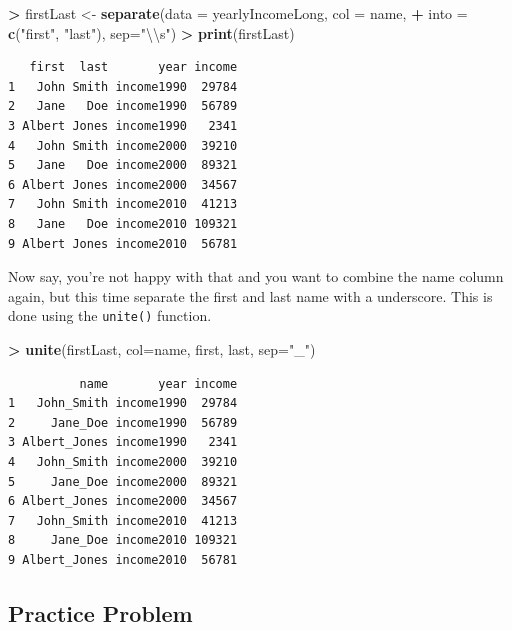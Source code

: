 \documentclass[
]{krantz}
\makeatletter
\newenvironment{Shaded}{\begin{snugshade}}{\end{snugshade}}
\newcommand{\CharTok}[1]{\textcolor[rgb]{0.5,0.5,0.5}{#1}}
\newcommand{\DataTypeTok}[1]{\textcolor[rgb]{0.27,0.27,0.27}{#1}}
\newcommand{\KeywordTok}[1]{\textcolor[rgb]{0.27,0.27,0.27}{\textbf{#1}}}
\newcommand{\NormalTok}[1]{#1}
\newcommand{\OperatorTok}[1]{\textcolor[rgb]{0.43,0.43,0.43}{\textbf{#1}}}
\newcommand{\StringTok}[1]{\textcolor[rgb]{0.5,0.5,0.5}{#1}}
\newenvironment{kframe}{%
\medskip{}
\setlength{\fboxsep}{.8em}
 \def\at@end@of@kframe{}%
 \ifinner\ifhmode%
  \def\at@end@of@kframe{\end{minipage}}%
  \begin{minipage}{\columnwidth}%
 \fi\fi%
 \def\FrameCommand##1{\hskip\@totalleftmargin \hskip-\fboxsep
 \colorbox{shadecolor}{##1}\hskip-\fboxsep
     \hskip-\linewidth \hskip-\@totalleftmargin \hskip\columnwidth}%
 \MakeFramed {\advance\hsize-\width
   \@totalleftmargin\z@ \linewidth\hsize
   \@setminipage}}%
 {\par\unskip\endMakeFramed%
 \at@end@of@kframe}
\renewenvironment{Shaded}{\begin{kframe}}{\end{kframe}}
\makeatother
\begin{document}
\begin{Shaded}
\begin{Highlighting}[]
\OperatorTok{\textgreater{}}\StringTok{ }\NormalTok{firstLast \textless{}{-}}\StringTok{ }\KeywordTok{separate}\NormalTok{(}\DataTypeTok{data =}\NormalTok{ yearlyIncomeLong, }\DataTypeTok{col =}\NormalTok{ name, }
\OperatorTok{+}\StringTok{                       }\DataTypeTok{into =} \KeywordTok{c}\NormalTok{(}\StringTok{"first"}\NormalTok{, }\StringTok{"last"}\NormalTok{), }\DataTypeTok{sep=}\StringTok{"}\CharTok{\textbackslash{}\textbackslash{}}\StringTok{s"}\NormalTok{)}
\OperatorTok{\textgreater{}}\StringTok{ }\KeywordTok{print}\NormalTok{(firstLast)}
\end{Highlighting}
\end{Shaded}

\begin{verbatim}
   first  last       year income
1   John Smith income1990  29784
2   Jane   Doe income1990  56789
3 Albert Jones income1990   2341
4   John Smith income2000  39210
5   Jane   Doe income2000  89321
6 Albert Jones income2000  34567
7   John Smith income2010  41213
8   Jane   Doe income2010 109321
9 Albert Jones income2010  56781
\end{verbatim}

Now say, you're not happy with that and you want to combine the name column again, but this time separate the first and last name with a underscore. This is done using the \texttt{unite()} function.

\begin{Shaded}
\begin{Highlighting}[]
\OperatorTok{\textgreater{}}\StringTok{ }\KeywordTok{unite}\NormalTok{(firstLast, }\DataTypeTok{col=}\NormalTok{name, first, last, }\DataTypeTok{sep=}\StringTok{"\_"}\NormalTok{)}
\end{Highlighting}
\end{Shaded}

\begin{verbatim}
          name       year income
1   John_Smith income1990  29784
2     Jane_Doe income1990  56789
3 Albert_Jones income1990   2341
4   John_Smith income2000  39210
5     Jane_Doe income2000  89321
6 Albert_Jones income2000  34567
7   John_Smith income2010  41213
8     Jane_Doe income2010 109321
9 Albert_Jones income2010  56781
\end{verbatim}

\hypertarget{practice-problem-7}{%
\subsection{Practice Problem}\label{practice-problem-7}}
\end{document}
